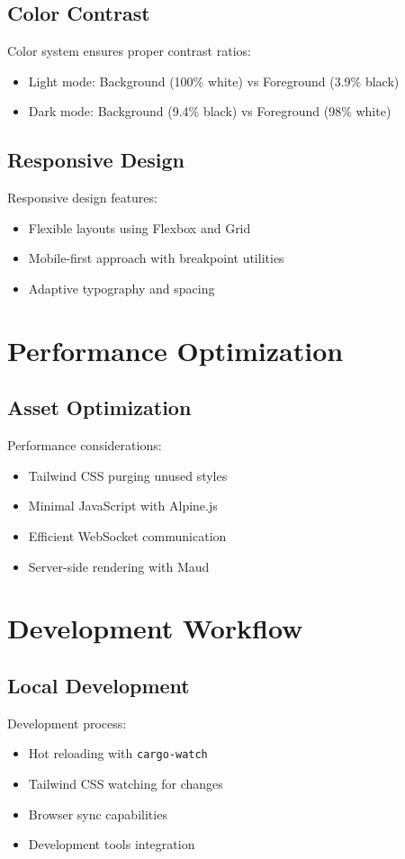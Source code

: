 \documentclass{article}
\begin{document}
\subsection{Color Contrast}
Color system ensures proper contrast ratios:
\begin{itemize}
    \item Light mode: Background (100\% white) vs Foreground (3.9\% black)
    \item Dark mode: Background (9.4\% black) vs Foreground (98\% white)
\end{itemize}

\subsection{Responsive Design}
Responsive design features:
\begin{itemize}
    \item Flexible layouts using Flexbox and Grid
    \item Mobile-first approach with breakpoint utilities
    \item Adaptive typography and spacing
\end{itemize}

\section{Performance Optimization}

\subsection{Asset Optimization}
Performance considerations:
\begin{itemize}
    \item Tailwind CSS purging unused styles
    \item Minimal JavaScript with Alpine.js
    \item Efficient WebSocket communication
    \item Server-side rendering with Maud
\end{itemize}

\section{Development Workflow}

\subsection{Local Development}
Development process:
\begin{itemize}
    \item Hot reloading with \texttt{cargo-watch}
    \item Tailwind CSS watching for changes
    \item Browser sync capabilities
    \item Development tools integration
\end{itemize}
\end{document}
